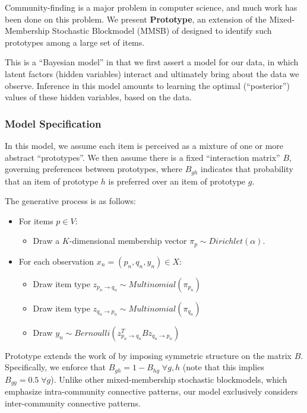 Community-finding is a major problem in computer science, and much work has been done on this problem.
We present \textbf{Prototype}, an extension of the Mixed-Membership Stochastic Blockmodel (MMSB) of \cite{airoldi:2008} designed to identify such prototypes among a large set of items.

This is a ``Bayesian model'' in that we first assert a model for our data, in which latent factors (hidden variables) interact and ultimately bring about the data we observe.
Inference in this model amounts to learning the optimal (``posterior'') values of these hidden variables, based on the data.

\subsubsection{Model Specification}

In this model, we assume each item is perceived as a mixture of one or more abstract ``prototypes''.
We then assume there is a fixed ``interaction matrix'' $B$, governing preferences between prototypes, where $B_{gh}$ indicates that probability that an item of prototype $h$ is preferred over an item of prototype $g$.

\bigskip

The generative process is as follows:
\begin{itemize}
	\item For items $p \in V$:
	\begin{itemize}
		\item Draw a $K$-dimensional membership vector $\pi_p \sim Dirichlet(\alpha)$.
	\end{itemize}
	\item For each observation $x_n = (p_n, q_n, y_n) \in X$:
	\begin{itemize}
		\item Draw item type $z_{p_n \rightarrow q_n} \sim Multinomial(\pi_{p_n})$
		\item Draw item type $z_{q_n \rightarrow p_n} \sim Multinomial(\pi_{q_n})$
		\item Draw $y_n \sim Bernoulli(z_{p_n \rightarrow q_n}^TBz_{q_n \rightarrow p_n})$
	\end{itemize}
\end{itemize}


Prototype extends the work of \citet{airoldi:2008} by imposing symmetric structure on the matrix $B$.
Specifically, we enforce that $B_{gh} = 1-B_{hg} \; \forall g,h$ (note that this implies $B_{gg}= 0.5 \; \forall g$).
Unlike other mixed-membership stochastic blockmodels, which emphasize intra-community connective patterns, our model exclusively considers inter-community connective patterns.

